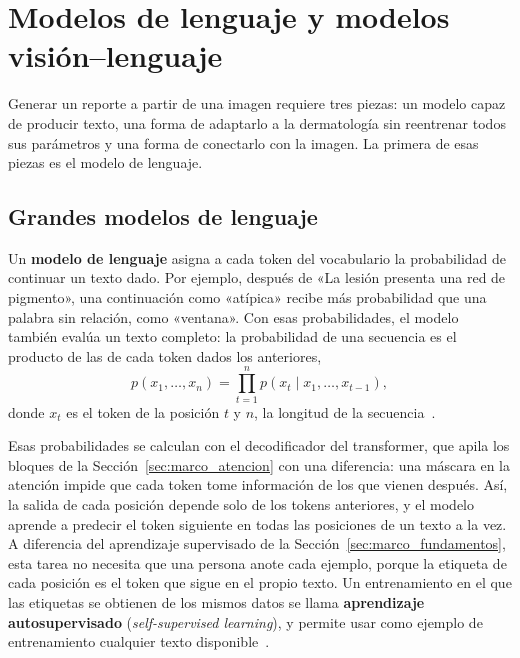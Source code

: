 \section{Modelos de lenguaje y modelos visión--lenguaje}
\label{sec:marco_llm}

Generar un reporte a partir de una imagen requiere tres piezas: un modelo capaz de
producir texto, una forma de adaptarlo a la dermatología sin reentrenar todos sus parámetros y una forma de
conectarlo con la imagen. La primera de esas piezas es el modelo de lenguaje.

\subsection{Grandes modelos de lenguaje}
\label{sec:marco_llm_grandes}

Un \textbf{modelo de lenguaje} asigna a cada token del vocabulario la probabilidad de continuar un texto dado.
Por ejemplo, después de «La lesión presenta una red de pigmento», una continuación como «atípica» recibe más
probabilidad que una palabra sin relación, como «ventana». Con esas probabilidades, el modelo también evalúa un texto completo: la probabilidad
de una secuencia es el producto de las de cada token dados los anteriores,
\begin{equation}
    p(x_1, \dots, x_n) = \prod_{t=1}^{n} p(x_t \mid x_1, \dots, x_{t-1}),
    \label{eq:marco_lm}
\end{equation}
donde $x_t$ es el token de la posición $t$ y $n$, la longitud de la secuencia~\cite{brown2020language}.

Esas probabilidades se calculan con el decodificador del transformer, que apila los bloques de la
Sección~\ref{sec:marco_atencion} con una diferencia: una máscara en la atención impide que cada token tome
información de los que vienen después. Así, la salida de cada posición depende solo de los tokens anteriores, y
el modelo aprende a predecir el token siguiente en todas las posiciones de un texto a la vez. A diferencia del
aprendizaje supervisado de la Sección~\ref{sec:marco_fundamentos}, esta tarea no necesita que una persona anote
cada ejemplo, porque la etiqueta de cada posición es el token que sigue en el propio texto. Un entrenamiento en el que las etiquetas se obtienen de los mismos datos se llama \textbf{aprendizaje
autosupervisado} (\emph{self-supervised learning}), y permite usar como ejemplo de entrenamiento cualquier texto
disponible~\cite{vaswani2017attention,brown2020language}.

